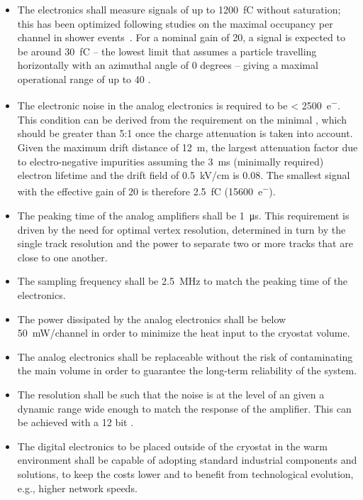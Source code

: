 \begin{itemize}
\item{The  electronics %
shall measure signals of up to \SI{1200}{\femto\coulomb} without saturation; this has been optimized following  studies on the maximal occupancy per channel in shower events~\cite{WA105_TDR}. For a nominal  gain of \num{20}, a  signal is expected to be around \SI{30}{fC} -- the lowest limit that assumes a particle travelling horizontally with an azimuthal angle of \num{0} degrees -- giving %
a maximal operational range of up to \num{40} .}

\item{The electronic noise in the  analog electronics is required to be \SI{< 2500}{e^{-}}. This condition can be derived from the requirement on the minimal , which should be greater than \num{5}:\num{1} once the charge attenuation is taken into account. Given the maximum drift distance of \SI{12}{\meter}, the largest attenuation factor due to electro-negative impurities assuming the \SI{3}{\milli\second} (minimally required) electron lifetime and the drift field of \SI{0.5}{\kilo\volt/\cm} is \num{0.08}. The smallest  signal with the  effective gain of \num{20} is therefore \SI{2.5}{\femto\coulomb} (\SI{15600}{e^{-}}).}

\item{The peaking time of the  analog amplifiers %
shall be \SI{1}{\micro\second}. This requirement is driven by the need for optimal vertex resolution, determined in turn by the single track resolution and the power to separate two or more tracks that are close to one another.}

\item{The sampling frequency %
shall be \SI{2.5}{\MHz} to match the peaking time of the  electronics.}

\item{The power dissipated by the  analog electronics %
shall be below \SI{50}{\milli\watt/channel} in order to minimize the heat input to the cryostat volume.}

\item{The  analog electronics %
shall be replaceable without the risk of contaminating the main \lar volume in order to guarantee the long-term reliability of the system.}

\item{The  resolution %
shall be such that the noise is at the level of an 
given a dynamic range wide enough to match the response of the  amplifier. This can be achieved with a \num{12} bit .}

\item{The digital electronics to be placed outside of the cryostat in the warm environment %
shall be capable of adopting standard industrial components and solutions, to keep the costs lower and to benefit from  %
technological evolution, e.g., higher network speeds.}
\end{itemize}
